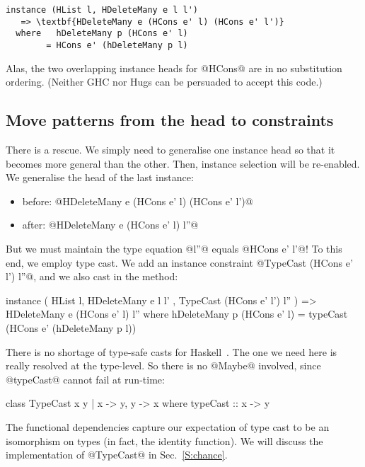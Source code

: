 \documentclass[nocopyrightspace,preprint]{sigplan-proc}
\begin{document}
\begin{Verbatim}[commandchars=\\\{\}]
 instance (HList l, HDeleteMany e l l')
   => \textbf{HDeleteMany e (HCons e' l) (HCons e' l')}
  where   hDeleteMany p (HCons e' l)
        = HCons e' (hDeleteMany p l)
\end{Verbatim}

Alas, the two overlapping instance heads for @HCons@ are in no
substitution ordering. (Neither GHC nor Hugs can be persuaded to
accept this code.)



\medskip

\subsection*{Move patterns from the head to constraints}

There is a rescue. We simply need to generalise one instance head so
that it becomes more general than the other. Then, instance selection
will be re-enabled. We generalise the head of the last instance:

\begin{itemize}
\item before: @HDeleteMany e (HCons e' l) (HCons e' l')@
\item after: @HDeleteMany e (HCons e' l) l''@
\end{itemize}

But we must maintain the type equation @l''@ equals @HCons e' l'@! To
this end, we employ type cast. We add an instance constraint
%
@TypeCast (HCons e' l') l''@,
%
and we also cast in the method:

\begin{code}
instance ( HList l, HDeleteMany e l l'
         , TypeCast (HCons e' l') l'' )
      =>   HDeleteMany e (HCons e' l) l''
 where     hDeleteMany p (HCons e' l)
         = typeCast (HCons e' (hDeleteMany p l))
\end{code}

There is no shortage of type-safe casts for
Haskell~\cite{Weirich00,CH02,BS02,LPJ03}. The one we need here is
really resolved at the type-level. So there is no @Maybe@ involved,
since @typeCast@ cannot fail at run-time:

\begin{code}
 class TypeCast x y | x -> y, y -> x
 where typeCast :: x -> y
\end{code}

The functional dependencies capture our expectation of type cast to be
an isomorphism on types (in fact, the identity function). We will discuss
the implementation of @TypeCast@ in Sec.~\ref{S:chance}.
\end{document}

